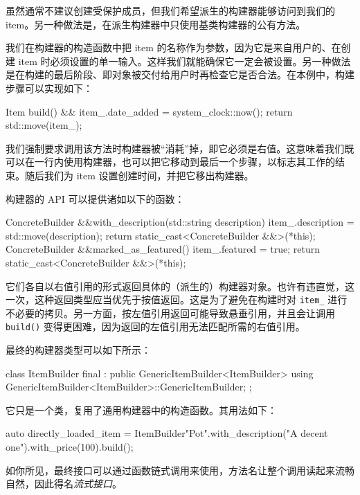虽然通常不建议创建受保护成员，但我们希望派生的构建器能够访问到我们的 item。另一种做法是，在派生构建器中只使用基类构建器的公有方法。

\label{idx:583}
我们在构建器的构造函数中把 item 的名称作为参数，因为它是来自用户的、在创建 item 时必须设置的单一输入。这样我们就能确保它一定会被设置。另一种做法是在构建的最后阶段、即对象被交付给用户时再检查它是否合法。在本例中，构建步骤可以实现如下：

\begin{codebox}[cpp]
Item build() && {
    item_.date_added = system_clock::now();
    return std::move(item_);
}
\end{codebox}

我们强制要求调用该方法时构建器被“消耗”掉，即它必须是右值。这意味着我们既可以在一行内使用构建器，也可以把它移动到最后一个步骤，以标志其工作的结束。随后我们为 item 设置创建时间，并把它移出构建器。

构建器的 API 可以提供诸如以下的函数：

\begin{codebox}[cpp]
ConcreteBuilder &&with_description(std::string description) {
    item_.description = std::move(description);
    return static_cast<ConcreteBuilder &&>(*this);
}
ConcreteBuilder &&marked_as_featured() {
    item_.featured = true;
    return static_cast<ConcreteBuilder &&>(*this);
}
\end{codebox}

它们各自以右值引用的形式返回具体的（派生的）构建器对象。也许有违直觉，这一次，这种返回类型应当优先于按值返回。这是为了避免在构建时对 \texttt{item\_} 进行不必要的拷贝。另一方面，按左值引用返回可能导致悬垂引用，并且会让调用 \texttt{build()} 变得更困难，因为返回的左值引用无法匹配所需的右值引用。

\label{idx:584}
最终的构建器类型可以如下所示：

\begin{codebox}[python]
class ItemBuilder final : public GenericItemBuilder<ItemBuilder> {
    using GenericItemBuilder<ItemBuilder>::GenericItemBuilder;
};
\end{codebox}

它只是一个类，复用了通用构建器中的构造函数。其用法如下：

\begin{codebox}[text]
auto directly_loaded_item = ItemBuilder{"Pot"}.with_description("A decent one").with_price(100).build();
\end{codebox}

如你所见，最终接口可以通过函数链式调用来使用，方法名让整个调用读起来流畅自然，因此得名\emph{流式接口}。

